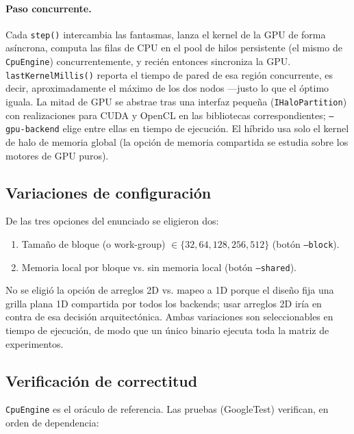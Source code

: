 \documentclass[
	spanish,
	letterpaper, oneside
]{article}
\begin{document}
\paragraph{Paso concurrente.} Cada \texttt{step()} intercambia las fantasmas, lanza
el kernel de la GPU de forma asíncrona, computa las filas de CPU en el
pool de hilos persistente (el mismo de \texttt{CpuEngine})
concurrentemente, y recién entonces sincroniza la GPU. \texttt{lastKernelMillis()}
reporta el tiempo de pared de esa región concurrente, es decir, aproximadamente el
máximo de los dos nodos ---justo lo que el óptimo iguala. La mitad de GPU se
abstrae tras una interfaz pequeña (\texttt{IHaloPartition}) con realizaciones para
CUDA y OpenCL en las bibliotecas correspondientes; \texttt{--gpu-backend} elige entre
ellas en tiempo de ejecución. El híbrido usa solo el kernel de halo de memoria global
(la opción de memoria compartida se estudia sobre los motores de GPU puros).

\subsection{Variaciones de configuración}
\label{sec:variaciones}

De las tres opciones del enunciado se eligieron dos:

\begin{enumerate}
	\item Tamaño de bloque (o work-group) $\in \{32, 64, 128, 256, 512\}$ (botón \texttt{--block}).
	\item Memoria local por bloque vs. sin memoria local (botón \texttt{--shared}).
\end{enumerate}

No se eligió la opción de arreglos 2D vs. mapeo a 1D porque el diseño fija
una grilla plana 1D compartida por todos los backends; usar arreglos 2D iría en
contra de esa decisión arquitectónica. Ambas variaciones son seleccionables en
tiempo de ejecución, de modo que un único binario ejecuta toda la matriz de
experimentos.

\subsection{Verificación de correctitud}
\label{sec:verificacion}

\texttt{CpuEngine} es el oráculo de referencia. Las pruebas (GoogleTest)
verifican, en orden de dependencia:
\end{document}
